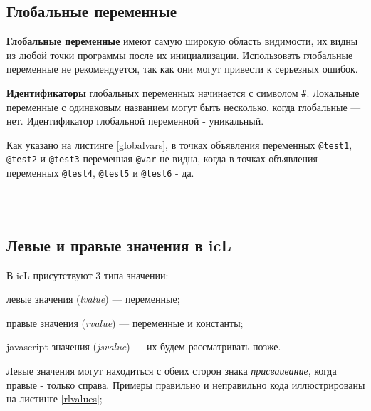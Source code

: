 \subsection{Глобальные переменные}

\textbf{Глобальные переменные} имеют самую широкую область видимости, их видны из любой точки программы после их инициализации. Использовать глобальные переменные не рекомендуется, так как они могут привести к серьезных ошибок.

{\bf Идентификаторы} глобальных переменных начинается с символом {\color{blue2}\texttt{#}}. Локальные переменные с одинаковым названием могут быть несколько, когда глобальные — нет. Идентификатор глобальной переменной - уникальный.

Как указано на листинге \ref{globalvars}, в точках объявления переменных \texttt{@test1}, \texttt{@test2} и \texttt{@test3} переменная \texttt{@var} не видна, когда в точках объявления переменных \texttt{@test4}, \texttt{@test5} и \texttt{@test6} - да.

\

\begin{sourcecode}
	\label{globalvars}
	\inputminted[linenos]{icl}{../sources/globalvars.icL}
\end{sourcecode}

\subsection{Левые и правые значения в icL}

В icL присутствуют 3 типа значении:

\begin{icEnum}
\item
	левые значения ({\it lvalue}) — переменные;
\item
	правые значения ({\it rvalue}) — переменные и константы;
\item
	javascript значения ({\it jsvalue}) — их будем рассматривать позже.
\end{icEnum}

Левые значения могут находиться с обеих сторон знака {\it присваивание}, когда правые - только справа. Примеры правильно и неправильно кода иллюстрированы на листинге \ref{rlvalues};

\begin{sourcecode}
	\label{rlvalues}
	\inputminted[linenos]{icl}{../sources/rlvalues.icL}
\end{sourcecode}

